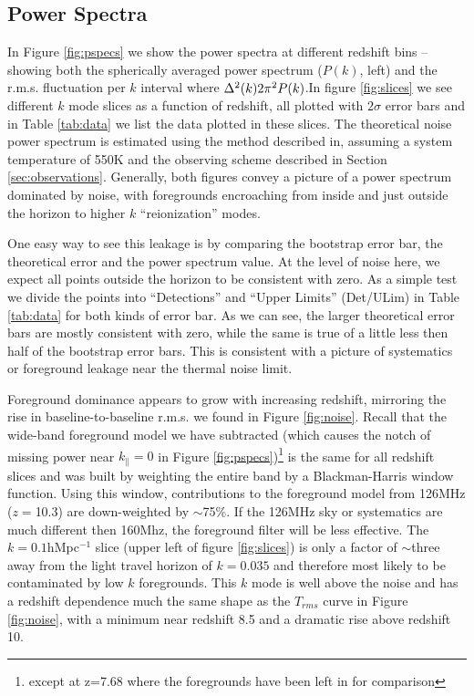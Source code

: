 \documentclass[preprint]{aastex}
\begin{document}
\subsection{Power Spectra}
\label{sec:pspecs}

In  Figure \ref{fig:pspecs} we show the  power spectra at different redshift bins --showing both the spherically averaged power spectrum ($P(k)$, left) and the r.m.s. fluctuation per $k$ interval where $\Delta^2(k)\def\frac{k^3}{2\pi^2}P(k)$.In figure \ref{fig:slices} we see different $k$ mode slices as a function of redshift,  all plotted with $2\sigma$ error bars and in Table \ref{tab:data} we list the data plotted in these slices.   The theoretical noise power spectrum is estimated using the method described in\cite{Pober:2013p9581}, assuming a system temperature of 550K and the observing scheme described in Section \ref{sec:observations}.  Generally, both figures convey a picture of a power spectrum dominated by noise, with foregrounds encroaching from inside and just outside the horizon to higher $k$ ``reionization'' modes.  

One easy way to see this leakage is by comparing the bootstrap error bar, the theoretical error and the power spectrum value.  At the level of noise here, we expect all points outside the horizon to be consistent with zero. As a simple test we divide the points into ``Detections'' and ``Upper Limits'' (Det/ULim) in Table \ref{tab:data} for both kinds of error bar.  As we can see, the larger theoretical error bars are mostly consistent with zero, while the same is true of a little less then half of the bootstrap error bars.  This is consistent with a picture of systematics or foreground leakage near the thermal noise limit.


Foreground dominance appears to grow with increasing redshift, mirroring the rise in baseline-to-baseline r.m.s. we found in Figure \ref{fig:noise}.  Recall that the wide-band foreground model we have subtracted  (which causes the notch of missing power near $k_\parallel=0$ in Figure \ref{fig:pspecs})\footnote{except at z=7.68 where the foregrounds have been left in for comparison} is the same for all redshift slices and was built by weighting the entire band by a Blackman-Harris window function.    Using this window, contributions to the foreground model from 126MHz ($z=$10.3) are down-weighted by $\sim$75\%. If the 126MHz sky or systematics are much different then 160Mhz, the foreground filter will be less effective. The $k=0.1$hMpc$^{-1}$ slice (upper left of figure \ref{fig:slices}) is only a factor of $\sim$three away from the light travel horizon of $k=0.035$ and therefore most likely to be contaminated by low $k$ foregrounds. This $k$ mode is well above the noise and has a redshift  dependence  much the same shape as the $T_{rms}$ curve in Figure \ref{fig:noise}, with a minimum near redshift 8.5 and a dramatic rise above redshift 10.
\end{document}

